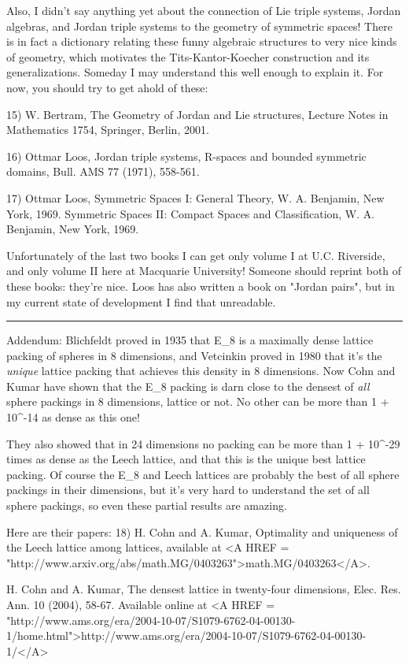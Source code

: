 Also, I didn't say anything yet about the connection of Lie triple
systems, Jordan algebras, and Jordan triple systems to the geometry 
of symmetric spaces!  There is in fact a dictionary relating these 
funny algebraic structures to very nice kinds of geometry, which
motivates the Tits-Kantor-Koecher construction and its generalizations.
Someday I may understand this well enough to explain it.  For now, 
you should try to get ahold of these:

15) W. Bertram, The Geometry of Jordan and Lie structures, 
Lecture Notes in Mathematics 1754, Springer, Berlin, 2001.

16) Ottmar Loos, Jordan triple systems, R-spaces and bounded symmetric 
domains, Bull. AMS 77 (1971), 558-561. 

17) Ottmar Loos, Symmetric Spaces I: General Theory, W. A. Benjamin, 
New York, 1969.  Symmetric Spaces II: Compact Spaces and Classification,
W. A. Benjamin, New York, 1969.

Unfortunately of the last two books I can get only volume I at U.C. 
Riverside, and only volume II here at Macquarie University!  Someone 
should reprint both of these books: they're nice.  Loos has also
written a book on "Jordan pairs", but in my current state of
development I find that unreadable.

\par\noindent\rule{\textwidth}{0.4pt}
Addendum: Blichfeldt proved in 1935 that E_{8} is a maximally dense
lattice packing of spheres in 8 dimensions, and Vetcinkin proved
in 1980 that it's the \emph{unique} lattice packing that 
achieves this density in 8 dimensions.
Now Cohn and Kumar have shown that the E_{8} packing is darn close to the 
densest of \emph{all} sphere packings in 8 dimensions, lattice or not.
No other can be more than 1 + 10^{-14} as dense as this one!

They also showed that in 24 dimensions no packing can be more than
1 + 10^{-29} times as dense as the Leech lattice, and that
this is the unique best lattice packing.  Of course the 
E_{8} and Leech lattices are probably the best of all sphere packings 
in their dimensions, but it's very hard to understand the set of 
all sphere packings, so even these partial results are amazing.

Here are their papers:
18) H. Cohn and A. Kumar, Optimality and uniqueness of the 
Leech lattice among lattices, available at <A HREF = 
"http://www.arxiv.org/abs/math.MG/0403263">math.MG/0403263</A>.

H. Cohn and A. Kumar, The densest lattice in twenty-four
dimensions, Elec. Res. Ann. 10 (2004), 58-67.   Available online
at <A HREF = "http://www.ams.org/era/2004-10-07/S1079-6762-04-00130-1/home.html">http://www.ams.org/era/2004-10-07/S1079-6762-04-00130-1/</A>

